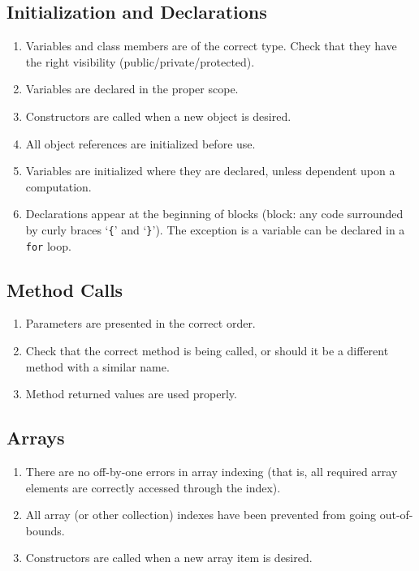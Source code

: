 \documentclass{article}
\begin{document}
\subsection*{Initialization and Declarations}\begin{enumerate}[resume]
\item Variables and class members are of the correct type. Check that they have the right visibility (public/private/protected).
\item Variables are declared in the proper scope.
\item Constructors are called when a new object is desired.
\item All object references are initialized before use.
\item Variables are initialized where they are declared, unless dependent upon a computation.
\item Declarations appear at the beginning of blocks (block: any code surrounded by curly braces `\texttt{\{}' and `\texttt{\}}'). The exception is a variable can be declared in a \texttt{for} loop.
\end{enumerate}

\subsection*{Method Calls}\begin{enumerate}[resume]
\item Parameters are presented in the correct order.
\item Check that the correct method is being called, or should it be a different method with a similar name.
\item Method returned values are used properly.
\end{enumerate}

\subsection*{Arrays}\begin{enumerate}[resume]
\item There are no off-by-one errors in array indexing (that is, all required array elements are correctly accessed through the index).
\item All array (or other collection) indexes have been prevented from going out-of-bounds.
\item Constructors are called when a new array item is desired.
\end{enumerate}
\end{document}
